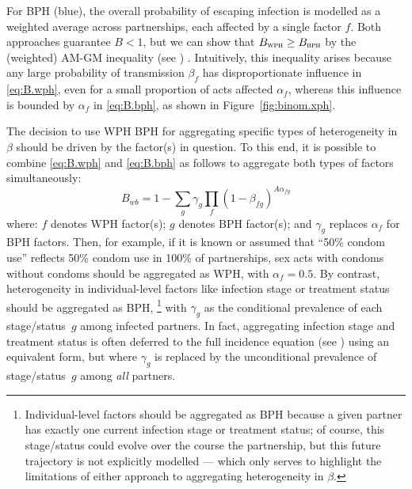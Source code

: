 For BPH (blue), the overall probability of escaping infection is modelled as
a weighted average across partnerships, each affected by a single factor $f$.
Both approaches guarantee $B < 1$,
but we can show that $B_{\textsc{wph}} \ge B_{\textsc{bph}}$
by the (weighted) AM-GM inequality (see ) \cite{Aldaz2009}.
Intuitively, this inequality arises because
any large probability of transmission $\beta_f$
has disproportionate influence in \eqref{eq:B.wph},
even for a small proportion of acts affected $\alpha_f$,
whereas this influence is bounded by $\alpha_f$ in \eqref{eq:B.bph},
as shown in Figure~\ref{fig:binom.xph}.
\par
The decision to use WPH \vs BPH for aggregating specific types of heterogeneity in $\beta$
should be driven by the factor(s) in question.
To this end, it is possible to combine \eqref{eq:B.wph} and \eqref{eq:B.bph} as follows
to aggregate both types of factors simultaneously:
\begin{equation}\label{eq:B.xph}
  B_{wb} = 1 - \sum_g \gamma_g \prod_f {(1 - \beta_{fg})}^{A\alpha_{fg}}
\end{equation}
where:
$f$ denotes WPH factor(s);
$g$ denotes BPH factor(s); and
$\gamma_g$ replaces $\alpha_f$ for BPH factors.
Then, for example, if it is known or assumed that
``50\% condom use'' reflects 50\% condom use in 100\% of partnerships,
sex acts with condoms \vs without condoms
should be aggregated as WPH, with $\alpha_f = 0.5$.
By contrast, heterogeneity in individual-level factors like infection stage or treatment status
should be aggregated as BPH,%
\footnote{\label{foot:xph.future}
  Individual-level factors should be aggregated as BPH because
  a given partner has exactly one current infection stage or treatment status;
  of course, this stage/status could evolve over the course the partnership,
  but this future trajectory is not explicitly modelled
  --- which only serves to highlight the limitations of
  either approach to aggregating heterogeneity in $\beta$.}
with $\gamma_g$ as the conditional prevalence of each stage/status~$g$ among infected partners.
In fact, aggregating infection stage and treatment status is often deferred to
the full incidence equation (see ) using an equivalent form,
but where $\gamma_g$ is replaced by
the unconditional prevalence of stage/status~$g$ among \emph{all} partners.
